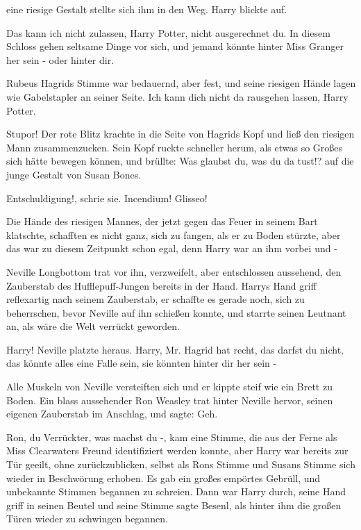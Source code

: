 eine riesige Gestalt stellte sich ihm in den Weg. Harry blickte auf.

\glqq{}Das kann ich nicht zulassen, Harry Potter, nicht ausgerechnet du. In
diesem Schloss gehen seltsame Dinge vor sich, und jemand könnte hinter Miss
Granger her sein - oder hinter dir.\grqq{}

Rubeus Hagrids Stimme war bedauernd, aber fest, und seine riesigen Hände lagen
wie Gabelstapler an seiner Seite. \glqq{}Ich kann dich nicht da rausgehen lassen,
Harry Potter.\grqq{}

\glqq{}Stupor!\grqq{} Der rote Blitz krachte in die Seite von Hagrids Kopf und
ließ den riesigen Mann zusammenzucken. Sein Kopf ruckte schneller herum, als
etwas so Großes sich hätte bewegen können, und brüllte: \glqq{}Was glaubst du,
was du da tust!?\grqq{} auf die junge Gestalt von Susan Bones.

\glqq{}Entschuldigung!\grqq{}, schrie sie. \glqq{}Incendium! Glisseo!\grqq{}

Die Hände des riesigen Mannes, der jetzt gegen das Feuer in seinem Bart
klatschte, schafften es nicht ganz, sich zu fangen, als er zu Boden stürzte,
aber das war zu diesem Zeitpunkt schon egal, denn Harry war an ihm vorbei und -

Neville Longbottom trat vor ihn, verzweifelt, aber entschlossen aussehend, den
Zauberstab des Hufflepuff-Jungen bereits in der Hand. Harrys Hand griff
reflexartig nach seinem Zauberstab, er schaffte es gerade noch, sich zu
beherrschen, bevor Neville auf ihn schießen konnte, und starrte seinen Leutnant
an, als wäre die Welt verrückt geworden.

\glqq{}Harry!\grqq{} Neville platzte heraus. \glqq{}Harry, Mr. Hagrid hat recht,
das darfst du nicht, das könnte alles eine Falle sein, sie könnten hinter dir
her sein -\grqq{}

Alle Muskeln von Neville versteiften sich und er kippte steif wie ein Brett zu
Boden. Ein blass aussehender Ron Weasley trat hinter Neville hervor, seinen
eigenen Zauberstab im Anschlag, und sagte: \glqq{}Geh.\grqq{}

\glqq{}Ron, du Verrückter, was machst du -\grqq{}, kam eine Stimme, die aus der
Ferne als Miss Clearwaters Freund identifiziert werden konnte, aber Harry war
bereits zur Tür geeilt, ohne zurückzublicken, selbst als Rons Stimme und Susans
Stimme sich wieder in Beschwörung erhoben. Es gab ein großes empörtes Gebrüll,
und unbekannte Stimmen begannen zu schreien. Dann war Harry durch, seine Hand
griff in seinen Beutel und seine Stimme sagte \glqq{}Besenl\grqq{}, als hinter
ihm die großen Türen wieder zu schwingen begannen.


